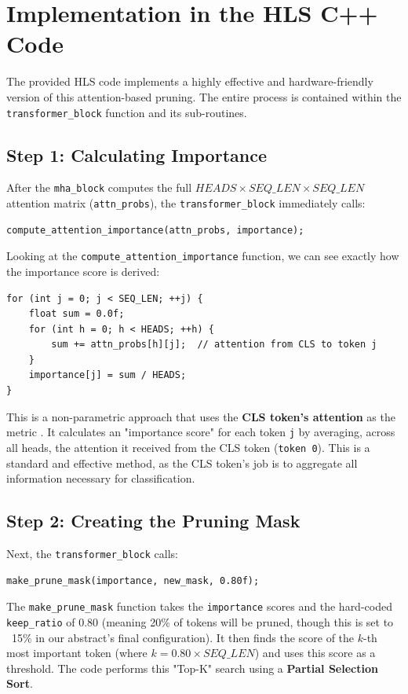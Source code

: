 \section{Implementation in the HLS C++ Code}

The provided HLS code implements a highly effective and hardware-friendly version of this attention-based pruning. The entire process is contained within the \texttt{transformer\_block} function and its sub-routines.

\subsection{Step 1: Calculating Importance}
After the \texttt{mha\_block} computes the full $HEADS \times SEQ\_LEN \times SEQ\_LEN$ attention matrix (\texttt{attn\_probs}), the \texttt{transformer\_block} immediately calls:
\begin{verbatim}
compute_attention_importance(attn_probs, importance);
\end{verbatim}
Looking at the \texttt{compute\_attention\_importance} function, we can see exactly how the importance score is derived:
\begin{verbatim}
for (int j = 0; j < SEQ_LEN; ++j) {
    float sum = 0.0f;
    for (int h = 0; h < HEADS; ++h) {
        sum += attn_probs[h][j];  // attention from CLS to token j
    }
    importance[j] = sum / HEADS;
}
\end{verbatim}
This is a non-parametric approach that uses the \textbf{CLS token's attention} as the metric \cite{ref4}. It calculates an "importance score" for each token \texttt{j} by averaging, across all heads, the attention it received from the CLS token (\texttt{token 0}). This is a standard and effective method, as the CLS token's job is to aggregate all information necessary for classification.

\subsection{Step 2: Creating the Pruning Mask}
Next, the \texttt{transformer\_block} calls:
\begin{verbatim}
make_prune_mask(importance, new_mask, 0.80f);
\end{verbatim}
The \texttt{make\_prune\_mask} function takes the \texttt{importance} scores and the hard-coded \texttt{keep\_ratio} of 0.80 (meaning 20\% of tokens will be pruned, though this is set to ~15\% in our abstract's final configuration). It then finds the score of the $k$-th most important token (where $k = 0.80 \times SEQ\_LEN$) and uses this score as a threshold. The code performs this "Top-K" search using a \textbf{Partial Selection Sort}.

